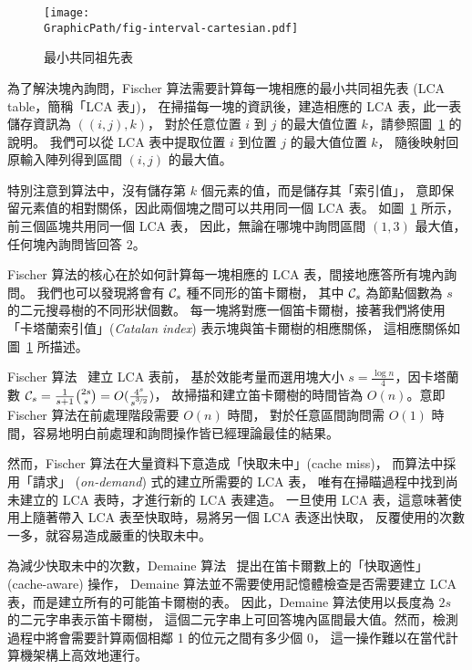 \begin{figure}[!thb]   
  \centering
  \texttt{[image: \\GraphicPath/fig-interval-cartesian.pdf]}
  \caption{最小共同祖先表}
  \label{fig:ancesstor-cartesian}
\end{figure}

為了解決塊內詢問，Fischer 算法需要計算每一塊相應的最小共同祖先表 (LCA table，簡稱「LCA 表」)，
在掃描每一塊的資訊後，建造相應的 LCA 表，此一表儲存資訊為 $((i, j), k)$，
對於任意位置 $i$ 到 $j$ 的最大值位置 $k$，請參照圖~\ref{fig:ancesstor-cartesian} 的說明。
我們可以從 LCA 表中提取位置 $i$ 到位置 $j$ 的最大值位置 $k$，
隨後映射回原輸入陣列得到區間 $(i, j)$ 的最大值。

特別注意到算法中，沒有儲存第 $k$ 個元素的值，而是儲存其「索引值」，
意即保留元素值的相對關係，因此兩個塊之間可以共用同一個 LCA 表。
如圖~\ref{fig:ancesstor-cartesian} 所示，前三個區塊共用同一個 LCA 表，
因此，無論在哪塊中詢問區間 $(1, 3)$ 最大值，任何塊內詢問皆回答 $2$。

Fischer 算法的核心在於如何計算每一塊相應的 LCA 表，間接地應答所有塊內詢問。
我們也可以發現將會有 ${\cal C}_s$ 種不同形的笛卡爾樹，
其中 ${\cal C}_s$ 為節點個數為 $s$ 的二元搜尋樹的不同形狀個數。
每一塊將對應一個笛卡爾樹，接著我們將使用「卡塔蘭索引值」({\em Catalan index}) 表示塊與笛卡爾樹的相應關係，
這相應關係如圖~\ref{fig:ancesstor-cartesian} 所描述。

Fischer 算法~\cite{Fischer2006TheoreticalAP} 建立 LCA 表前，
基於效能考量而選用塊大小 $s = \frac{\log n}{4}$，因卡塔蘭數 ${\cal C}_s =
\frac{1}{s+1}\binom{2s}{s} = O(\frac{4^s}{s^{\nicefrac{3}{2}}})$，
故掃描和建立笛卡爾樹的時間皆為 $O(n)$。意即 Fischer 算法在前處理階段需要 $O(n)$ 時間，
對於任意區間詢問需 $O(1)$ 時間，容易地明白前處理和詢問操作皆已經理論最佳的結果。

然而，Fischer 算法在大量資料下意造成「快取未中」(cache miss)，
而算法中採用「請求」 ({\em on-demand}) 式的建立所需要的 LCA 表，
唯有在掃瞄過程中找到尚未建立的 LCA 表時，才進行新的 LCA 表建造。
一旦使用 LCA 表，這意味著使用上隨著帶入 LCA 表至快取時，易將另一個 LCA 表逐出快取，
反覆使用的次數一多，就容易造成嚴重的快取未中。

為減少快取未中的次數，Demaine 算法~\cite{Demaine2009OnCT} 
提出在笛卡爾數上的「快取適性」(cache-aware) 操作，
Demaine 算法並不需要使用記憶體檢查是否需要建立 LCA 表，而是建立所有的可能笛卡爾樹的表。
因此，Demaine 算法使用以長度為 $2s$ 的二元字串表示笛卡爾樹，
這個二元字串上可回答塊內區間最大值。然而，檢測過程中將會需要計算兩個相鄰 1 的位元之間有多少個 0，
這一操作難以在當代計算機架構上高效地運行。

